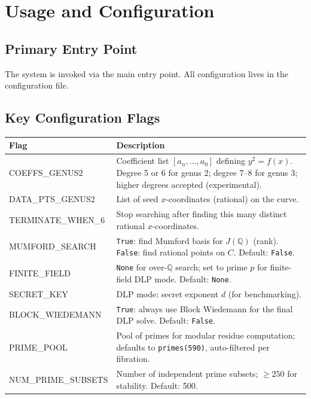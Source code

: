 \documentclass[11pt, a4paper]{article}
\begin{document}
\section{Usage and Configuration}

\subsection{Primary Entry Point}

The system is invoked via the main entry point. All configuration lives in the configuration file.

\subsection{Key Configuration Flags}

\begin{table}[h]
    \centering
    \renewcommand{\arraystretch}{1.2}
    \begin{tabularx}{\textwidth}{l X}
        \toprule
        \textbf{Flag} & \textbf{Description} \\
        \midrule
        COEFFS\_GENUS2 & Coefficient list $[a_n, \dots, a_0]$ defining $y^2 = f(x)$. Degree 5 or 6 for genus 2; degree 7--8 for genus 3; higher degrees accepted (experimental). \\
        DATA\_PTS\_GENUS2 & List of seed $x$-coordinates (rational) on the curve. \\
        TERMINATE\_WHEN\_6 & Stop searching after finding this many distinct rational $x$-coordinates. \\
        MUMFORD\_SEARCH & \texttt{True}: find Mumford basis for $J(\mathbb{Q})$ (rank). \texttt{False}: find rational points on $C$. Default: \texttt{False}. \\
        FINITE\_FIELD & \texttt{None} for over-$\mathbb{Q}$ search; set to prime $p$ for finite-field DLP mode. Default: \texttt{None}. \\
        SECRET\_KEY & DLP mode: secret exponent $d$ (for benchmarking). \\
        BLOCK\_WIEDEMANN & \texttt{True}: always use Block Wiedemann for the final DLP solve. Default: \texttt{False}. \\
        PRIME\_POOL & Pool of primes for modular residue computation; defaults to \texttt{primes(590)}, auto-filtered per fibration. \\
        NUM\_PRIME\_SUBSETS & Number of independent prime subsets; $\geq 250$ for stability. Default: 500. \\

\end{tabularx}
\end{table}
\end{document}
